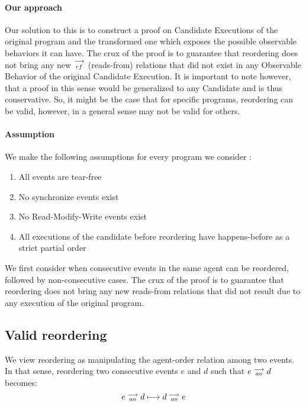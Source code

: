    \paragraph{Our approach}
    Our solution to this is to construct a proof on Candidate Executions of the original program and the transformed one which exposes the possible observable behaviors it can have.   
    The crux of the proof is to guarantee that reordering does not bring any new $\stackrel{\longrightarrow}{_{rf}}$ (reads-from) relations that did not exist in any Observable Behavior of the original Candidate Execution. 
    It is important to note however, that a proof in this sense would be generalized to any Candidate and is thus conservative.
    So, it might be the case that for specific programs, reordering can be valid, however, in a general sense may not be valid for others. 

    \paragraph{Assumption}
    We make the following assumptions for every program we consider :
    \begin{enumerate}
        \item All events are tear-free
        \item No synchronize events exist
        \item No Read-Modify-Write events exist
        \item All executions of the candidate before reordering have happens-before as a strict partial order
    \end{enumerate}
    
    We first consider when consecutive events in the same agent can be reordered, followed by non-consecutive cases. The crux of the proof is to guarantee that reordering does not bring any new reads-from relations that did not result due to any execution of the original program. 
    


    

    

\subsection{Valid reordering}
    We view reordering as manipulating the agent-order relation among two events. In that sense, reordering two consecutive events $e$ and $d$ such that $e \stackrel{\longrightarrow}{_{ao}} d$ becomes:
    \[
        e \stackrel{\longrightarrow}{_{ao}} d 
        \longmapsto
        d \stackrel{\longrightarrow}{_{ao}} e 
    \]

